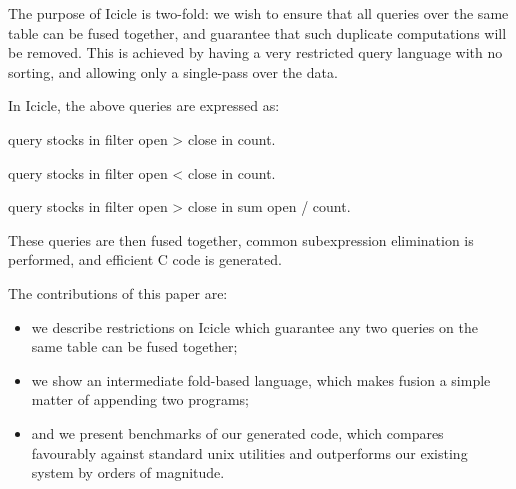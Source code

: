 The purpose of Icicle is two-fold: we wish to ensure that all queries over the same table can be fused together, and guarantee that such duplicate computations will be removed.
This is achieved by having a very restricted query language with no sorting, and allowing only a single-pass over the data.

In Icicle, the above queries are expressed as:
\begin{code}
query stocks
in filter open > close
in count.

query stocks
in filter open < close
in count.

query stocks
in filter open > close
in sum open / count.
\end{code}

These queries are then fused together, common subexpression elimination is performed, and efficient C code is generated.

The contributions of this paper are:
\begin{itemize}
\item
we describe restrictions on Icicle which guarantee any two queries on the same table can be fused together;
\item
we show an intermediate fold-based language, which makes fusion a simple matter of appending two programs;
\item
and we present benchmarks of our generated code, which compares favourably against standard unix utilities and outperforms our existing system by orders of magnitude.
\end{itemize}
